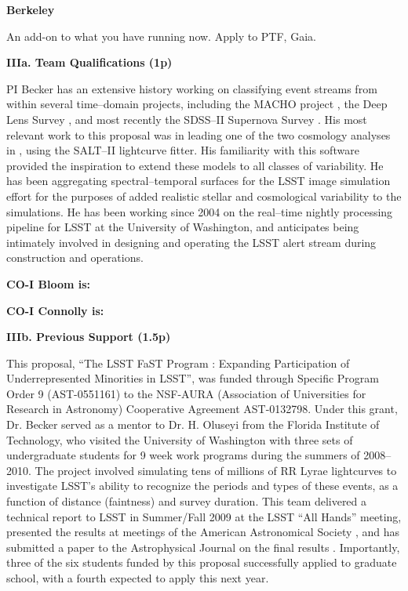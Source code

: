  \smallskip
{\bf Berkeley}

An add-on to what you have running now.  Apply to PTF, Gaia.



\bigskip \centerline{\bf IIIa. Team Qualifications (1p)} \smallskip

 \smallskip

PI Becker has an extensive history working on classifying event streams from
within several time--domain projects, including the MACHO project
\citep{2000PhDT.......258B}, the Deep Lens Survey \citep{2004ApJ...611..418B},
and most recently the SDSS--II Supernova Survey
\citep{2008AJ....135..338F,2008AJ....135..348S}.  His most relevant work to this
proposal was in leading one of the two cosmology analyses in
\cite{2009ApJS..185...32K}, using the SALT--II lightcurve fitter.  His
familiarity with this software provided the inspiration to extend these models
to all classes of variability. He has been aggregating spectral--temporal
surfaces for the LSST image simulation effort \citep{2010SPIE.7738E..53C} for
the purposes of added realistic stellar and cosmological variability to the
simulations.  He has been working since 2004 on the real--time nightly
processing pipeline for LSST at the University of Washington, and anticipates
being intimately involved in designing and operating the LSST alert stream
during construction and operations.

 \smallskip

{\bf CO-I Bloom is:}

 \smallskip

{\bf CO-I Connolly is:}

\bigskip \centerline{\bf IIIb. Previous Support (1.5p)} \smallskip

\smallskip

This proposal, ``The LSST FaST Program : Expanding Participation of
Underrepresented Minorities in LSST'', was funded through Specific Program Order
9 (AST-0551161) to the NSF-AURA (Association of Universities for Research in
Astronomy) Cooperative Agreement AST-0132798.  Under this grant, Dr. Becker
served as a mentor to Dr. H. Oluseyi from the Florida Institute of Technology,
who visited the University of Washington with three sets of undergraduate
students for 9 week work programs during the summers of 2008--2010.  The project
involved simulating tens of millions of RR Lyrae lightcurves to investigate
LSST's ability to recognize the periods and types of these events, as a function
of distance (faintness) and survey duration.  This team delivered a technical
report to LSST in Summer/Fall 2009 at the LSST ``All Hands'' meeting, presented
the results at meetings of the American Astronomical Society
\citep{2011AAS...21725213O,2010AAS...21540118O,2009AAS...21346014O}, and has
submitted a paper to the Astrophysical Journal on the final results
\citep{RRLyrae}.  Importantly, three of the six students funded by this proposal
successfully applied to graduate school, with a fourth expected to apply this
next year.

